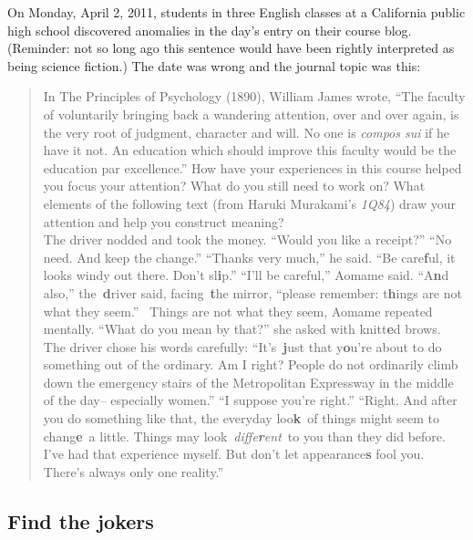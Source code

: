 On Monday, April 2, 2011, students in three English classes at a
California public high school discovered anomalies in the day's entry on
their course blog. (Reminder: not so long ago this sentence would have
been rightly interpreted as being science fiction.) The date was wrong
and the journal topic was this:

\begin{quote}
In The Principles of Psychology (1890), William James wrote, ``The
faculty of voluntarily bringing back a wandering attention, over and
over again, is the very root of judgment, character and will. No one is
\emph{compos sui} if he have it not. An education which should improve
this faculty would be the education par excellence.'' How have your
experiences in this course helped you focus your attention? What do you
still need to work on? What elements of the following text (from Haruki
Murakami's \emph{1Q84}) draw your attention and help you construct
meaning?\\[.2cm] The driver nodded and took the money. ``Would you like a
receipt?'' ``No need. And keep the change.'' ``Thanks very much,'' he
said. ``Be care\textbf{f}ul, it looks windy out there. Don't
sl\textbf{i}p.'' ``I'll be careful,'' Aomame said. ``A\textbf{n}d
also,'' the~\textbf{d}river said, facing~\textbf{t}he mirror, ``please
remember: t\textbf{h}ings are not what they seem.''~ Things are not what
they seem, Aomame repeated mentally. ``What do you mean by that?'' she
asked with knitt\textbf{e}d brows. The driver chose his words carefully:
``It's~\textbf{j}ust that y\textbf{o}u're about to do something out of
the ordinary. Am I right? People do not ordinarily climb down the
emergency stairs of the Metropolitan Expressway in the middle of the
day-- especially women.'' ``I suppose you're right.'' ``Right. And after
you do something like that, the everyday loo\textbf{k}~of things might
seem to chang\textbf{e}~a little. Things may
look~\emph{diffe\textbf{r}ent}~to you than they did before. I've had
that experience myself. But don't let appearance\textbf{s} fool you.
There's always only one reality.''
\end{quote}

\subsection{Find the jokers}\label{find-the-jokers}


